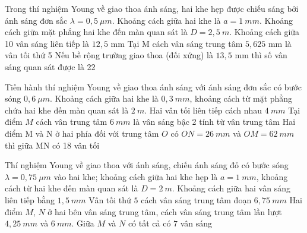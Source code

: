\begin{ex}
Trong thí nghiệm Young về giao thoa ánh sáng, hai khe hẹp được chiếu sáng bởi ánh sáng đơn sắc $\lambda = 0,5\ \mu m$. Khoảng cách giữa hai khe là $a = 1\ mm$. Khoảng cách giữa mặt phẳng hai khe đến màn quan sát là $D = 2,5\ m$.
{Khoảng cách giữa 10 vân sáng liên tiếp là $12,5$ mm}
{\True Tại M cách vân sáng trung tâm $5,625$ mm là vân tối thứ 5}
{Nếu bề rộng trường giao thoa (đối xứng) là $13,5$ mm thì số vân sáng quan sát được là 22}
\end{ex}
\begin{ex}
Tiến hành thí nghiệm Young về giao thoa ánh sáng với ánh sáng đơn sắc có bước sóng $0,6\ \mu m$. Khoảng cách giữa hai khe là $0,3\ mm$, khoảng cách từ mặt phẳng chứa hai khe đến màn quan sát là $2\ m$.
{\True Hai vân tối liên tiếp cách nhau $4\ mm$}
{Tại điểm $M$ cách vân trung tâm $6\ mm$ là vân sáng bậc 2 tính từ vân trung tâm}
{Hai điểm M và N ở hai phía đối với trung tâm $O$ có $ON=26\ mm$ và $OM=62\ mm$ thì giữa MN có 18 vân tối}
\end{ex}
\begin{ex}
Thí nghiệm Young về giao thoa với ánh sáng, chiếu ánh sáng đỏ có bước sóng $\lambda=0,75\ \mu m$ vào hai khe; khoảng cách giữa hai khe hẹp là $a=1\ mm$, khoảng cách từ hai khe đến màn quan sát là $D=2\ m$.
{\True Khoảng cách giữa hai vân sáng liên tiếp bằng $1,5\ mm$}
{\True Vân tối thứ $5$ cách vân sáng trung tâm đoạn $6,75\ mm$}
{Hai điểm $M$, $N$ ở hai bên vân sáng trung tâm, cách vân sáng trung tâm lần lượt $4,25\ mm$ và $6\ mm$. Giữa $M$ và $N$ có tất cả có $7$ vân sáng}
\loigiai{
\begin{itemchoice}
\itemch
\itemch
\itemch
\itemch
\end{itemchoice}
}
\end{ex}
\setcounter{ex}{0}
\PhanIII

